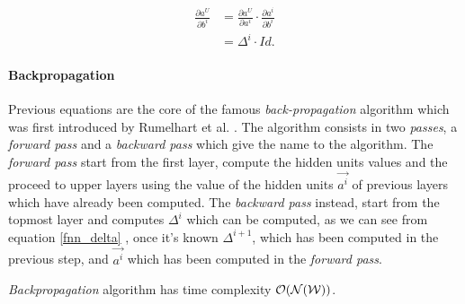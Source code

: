 \begin{align}
\frac{\partial a^U}{\partial b^i} &= \frac{\partial a^U}{\partial a^i} \cdot \frac{\partial a^i}{\partial b^i}\\
&= \Delta^{i} \cdot Id.
\end{align}


\paragraph{Backpropagation}

Previous equations are the core of the famous \textit{back-propagation} algorithm which was first introduced by Rumelhart et al. \cite{Rumelhart86}.
The algorithm consists in two \textit{passes}, a \textit{forward pass} and a \textit{backward pass} which give the name to the algorithm.
The \textit{forward pass} start from the first layer, compute the hidden units values and the proceed to upper layers using the value of the hidden units 
$\vec{a^i}$ of previous layers which have already been computed. The \textit{backward pass} instead, start from the topmost layer and computes $\Delta^{i}$
which can be computed, as we can see from equation \ref{fnn_delta} , once it's known $\Delta^{i+1}$, which has been computed in the previous step, and $\vec{a^i}$ which
has been computed in the \textit{forward pass}.

\textit{Backpropagation} algorithm has time complexity $\mathcal{O}(\mathcal{N}(\mathcal{W}))$.

